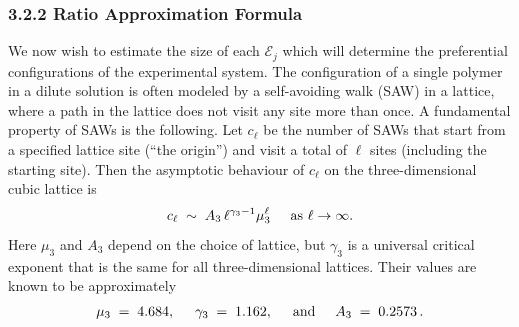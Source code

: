 \documentclass[journal=mamobx,manuscript=article]{achemso}
\begin{document}
\subsubsection{3.2.2 Ratio Approximation Formula}
We now wish to estimate the size of each $\mathcal{E}_j$ which will determine the preferential configurations of the experimental system. The configuration of a single  polymer in a dilute solution is often modeled by a self-avoiding walk (SAW) in a lattice, where a path in the lattice does not visit any site more than once. A fundamental property of SAWs is the following.
Let $c_{\ell}$ be
the number of SAWs that start from a specified lattice site (``the origin'') and visit a total of $\ell$ sites
(including the starting site).   Then the 
asymptotic behaviour of $c_{\ell}$ on the three-dimensional cubic lattice is 
\begin{equation}
    \label{eq.sawscale}
       c_{\ell}  \;\sim  \;  A_3 \, {\ell}^{\gamma_3-1}  \mu_3^{\ell}    \hspace{5mm}\hbox{as $\ell\rightarrow\infty$}.
\end{equation}
Here $\mu_3$ and $A_3$ depend on the choice of lattice, but $\gamma_3$ is a universal critical exponent
that is the same for all three-dimensional lattices.  
Their values are known to be approximately \cite{Chen2002,Madras2013}
\begin{equation}
   \label{eq.gammas}   \mu_3 \;=\;  4.684, \hspace{5mm}
        \gamma_3 \;=\;  1.162,    \hspace{5mm}\hbox{and}\hspace{5mm}
    A_3  \;=\;    0.2573  \,.  %
\end{equation}

\end{document}
